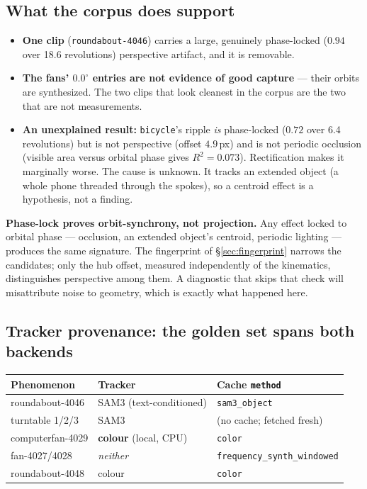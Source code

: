 \documentclass[11pt,a4paper]{article}
\begin{document}
\subsection{What the corpus does support}

\begin{itemize}
  \item \textbf{One clip} (\texttt{roundabout-4046}) carries a large, genuinely phase-locked
  ($0.94$ over 18.6 revolutions) perspective artifact, and it is removable.
  \item \textbf{The fans' $0.0^\circ$ entries are not evidence of good capture} --- their orbits
  are synthesized. The two clips that look cleanest in the corpus are the two that are not
  measurements.
  \item \textbf{An unexplained result:} \texttt{bicycle}'s ripple \emph{is} phase-locked
  ($0.72$ over 6.4 revolutions) but is not perspective (offset $4.9$\,px) and is not periodic
  occlusion (visible area versus orbital phase gives $R^2 = 0.073$). Rectification makes it
  marginally worse. The cause is unknown. It tracks an extended object (a whole phone threaded
  through the spokes), so a centroid effect is a hypothesis, not a finding.
\end{itemize}

\textbf{Phase-lock proves orbit-synchrony, not projection.} Any effect locked to orbital phase
--- occlusion, an extended object's centroid, periodic lighting --- produces the same signature.
The fingerprint of \S\ref{sec:fingerprint} narrows the candidates; only the hub offset, measured
independently of the kinematics, distinguishes perspective among them. A diagnostic that skips
that check will misattribute noise to geometry, which is exactly what happened here.

\subsection{Tracker provenance: the golden set spans both backends}
\label{sec:backends}

\begin{center}
\begin{tabular}{lll}
\toprule
Phenomenon & Tracker & Cache \texttt{method} \\
\midrule
roundabout-4046 & SAM3 (text-conditioned) & \texttt{sam3\_object} \\
turntable 1/2/3 & SAM3 & (no cache; fetched fresh) \\
computerfan-4029 & \textbf{colour} (local, CPU) & \texttt{color} \\
fan-4027/4028 & \emph{neither} & \texttt{frequency\_synth\_windowed} \\
roundabout-4048 & colour & \texttt{color} \\
\bottomrule
\end{tabular}
\end{center}
\end{document}
